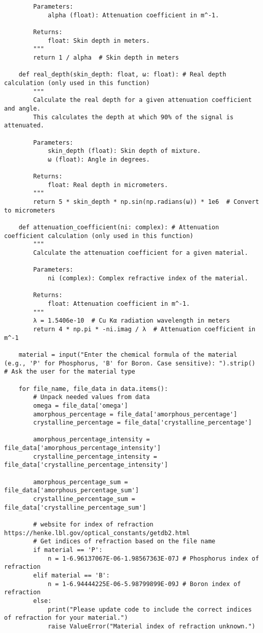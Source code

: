 \begin{small}
\begin{verbatim}
        Parameters:
            alpha (float): Attenuation coefficient in m^-1.

        Returns:
            float: Skin depth in meters.
        """
        return 1 / alpha  # Skin depth in meters

    def real_depth(skin_depth: float, ω: float): # Real depth calculation (only used in this function)
        """
        Calculate the real depth for a given attenuation coefficient and angle.
        This calculates the depth at which 90% of the signal is attenuated.

        Parameters:
            skin_depth (float): Skin depth of mixture.
            ω (float): Angle in degrees.

        Returns:
            float: Real depth in micrometers.
        """
        return 5 * skin_depth * np.sin(np.radians(ω)) * 1e6  # Convert to micrometers

    def attenuation_coefficient(ni: complex): # Attenuation coefficient calculation (only used in this function)
        """
        Calculate the attenuation coefficient for a given material.

        Parameters:
            ni (complex): Complex refractive index of the material.

        Returns:
            float: Attenuation coefficient in m^-1.
        """
        λ = 1.5406e-10  # Cu Kα radiation wavelength in meters
        return 4 * np.pi * -ni.imag / λ  # Attenuation coefficient in m^-1
    
    material = input("Enter the chemical formula of the material (e.g., 'P' for Phosphorus, 'B' for Boron. Case sensitive): ").strip()  # Ask the user for the material type

    for file_name, file_data in data.items():
        # Unpack needed values from data
        omega = file_data['omega']
        amorphous_percentage = file_data['amorphous_percentage']
        crystalline_percentage = file_data['crystalline_percentage']

        amorphous_percentage_intensity = file_data['amorphous_percentage_intensity']
        crystalline_percentage_intensity = file_data['crystalline_percentage_intensity']

        amorphous_percentage_sum = file_data['amorphous_percentage_sum']
        crystalline_percentage_sum = file_data['crystalline_percentage_sum']

        # website for index of refraction https://henke.lbl.gov/optical_constants/getdb2.html
        # Get indices of refraction based on the file name
        if material == 'P':
            n = 1-6.96137067E-06-1.98567363E-07J # Phosphorus index of refraction
        elif material == 'B':
            n = 1-6.94444225E-06-5.98799899E-09J # Boron index of refraction
        else:
            print("Please update code to include the correct indices of refraction for your material.")
            raise ValueError("Material index of refraction unknown.")


\end{verbatim}
\end{small}
